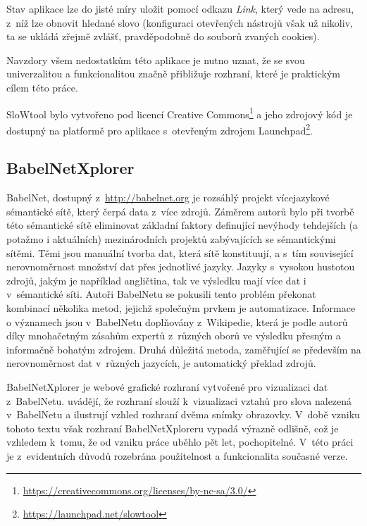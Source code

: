 \documentclass[a4paper, 11pt, oneside, showtrims]{book}
\begin{document}
					Stav aplikace lze do jisté míry uložit pomocí odkazu \textit{Link}, který vede na adresu, z~níž lze obnovit hledané slovo (konfiguraci otevřených nástrojů však už nikoliv, ta se ukládá zřejmě zvlášť, pravděpodobně do souborů zvaných cookies).

					Navzdory všem nedostatkům této aplikace je nutno uznat, že se svou univerzalitou a funkcionalitou značně přibližuje rozhraní, které je praktickým cílem této práce.

					SloWtool bylo vytvořeno pod licencí Creative Commons\footnote{\url{https://creativecommons.org/licenses/by-nc-sa/3.0/}} a jeho zdrojový kód je dostupný na platformě pro aplikace s~otevřeným zdrojem Launchpad\footnote{\url{https://launchpad.net/slowtool}}. \parencite{fivser2011visualizing}

				\subsection{BabelNetXplorer}
				\label{vis:babel}

					BabelNet, dostupný z~\url{http://babelnet.org} je rozsáhlý projekt vícejazykové sémantické sítě, který čerpá data z~více zdrojů. Záměrem autorů bylo při tvorbě této sémantické sítě 
					eliminovat základní faktory definující nevýhody tehdejších (a potažmo i aktuálních) mezinárodních projektů zabývajících se sémantickými sítěmi. Těmi jsou manuální tvorba dat, která sítě konstituují, a s~tím související nerovnoměrnost množství dat přes jednotlivé jazyky. Jazyky s~vysokou hustotou zdrojů, jakým je například angličtina, tak ve výsledku mají více dat i v~sémantické síti. Autoři BabelNetu se pokusili tento problém překonat kombinací několika metod, jejichž společným prvkem je automatizace. Informace o významech jsou v~BabelNetu doplňovány z~Wikipedie, která je podle autorů díky mnohačetným zásahům expertů z~různých oborů ve výsledku přesným a informačně bohatým zdrojem. Druhá důležitá metoda, zaměřující se především na nerovnoměrnost dat v~různých jazycích, je automatický překlad zdrojů. \parencite{navigli2010babelnet}

					BabelNetXplorer je webové grafické rozhraní vytvořené pro vizualizaci dat z~BabelNetu. \textcite{navigli2012babelnetxplorer} uvádějí, že rozhraní slouží k~vizualizaci vztahů pro slova nalezená v~BabelNetu a ilustrují vzhled rozhraní dvěma snímky obrazovky. V~době vzniku tohoto textu však rozhraní BabelNetXploreru vypadá výrazně odlišně, což je vzhledem k~tomu, že od vzniku práce \textcite{navigli2012babelnetxplorer} uběhlo pět let, pochopitelné. V~této práci je z~evidentních důvodů rozebrána použitelnost a funkcionalita současné verze.
\end{document}
